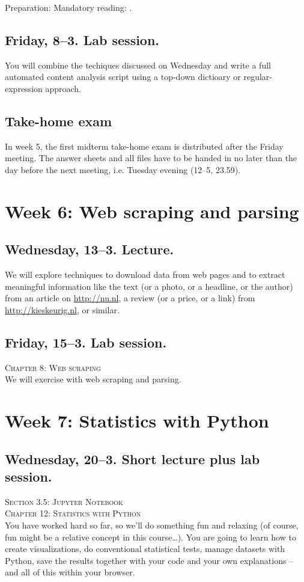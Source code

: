 \documentclass[a4paper,10pt]{report}
\begin{document}
Preparation: Mandatory reading: \cite{Boumans2016}. 




\subsection*{Friday, 8--3. Lab session.}
You will combine the techiques discussed on Wednesday and write a full automated content analysis script using a top-down dictioary or regular-expression approach.



\subsection*{Take-home exam}
In week 5, the first midterm take-home exam is distributed after the Friday meeting. The answer sheets and all files have to be handed in no later than the day before the next meeting, i.e. Tuesday evening (12--5, 23.59).




\section*{Week 6: Web scraping and parsing}

\subsection*{Wednesday, 13--3. Lecture.}
We will explore techniques to download data from web pages and to extract meaningful information like the text (or a photo, or a headline, or the author) from an article on \url{http://nu.nl}, a review (or a price, or a link) from \url{http://kieskeurig.nl}, or similar. 

\subsection*{Friday, 15--3. Lab session.}
\textsc{ Chapter 8: Web scraping}\\
We will exercise with web scraping and parsing.





\section*{Week 7: Statistics with Python}

\subsection*{Wednesday, 20--3. Short lecture plus lab session.}
\textsc{ Section 3.5: Jupyter Notebook}\\
\textsc{ Chapter 12: Statistics with Python}\\
You have worked hard so far, so we'll do something fun and relaxing (of course, fun might be a relative concept in this course\ldots). You are going to learn how to create visualizations, do conventional statistical tests, manage datasets with Python, save the results together with your code and your own explanations -- and all of this within your browser.
\end{document}
